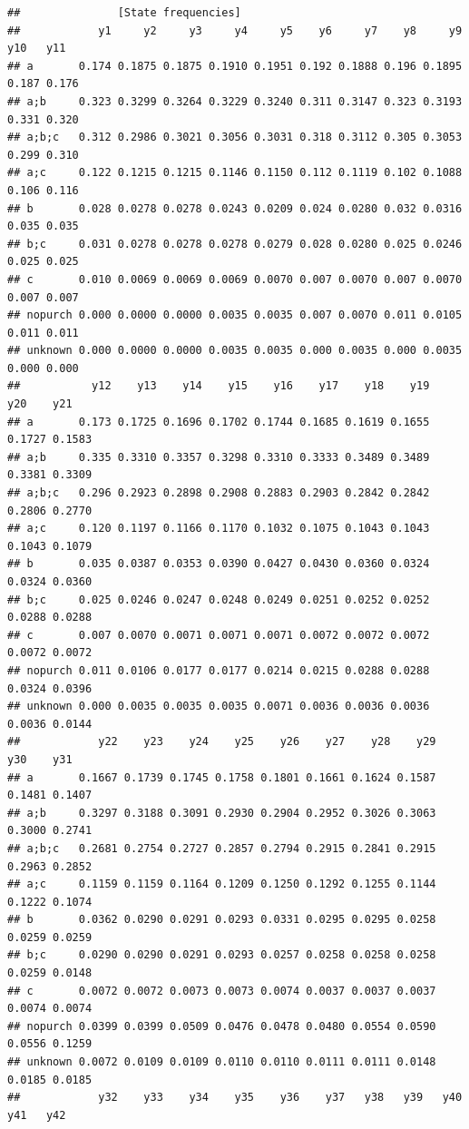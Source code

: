 \documentclass[
]{book}
\begin{document}
\begin{verbatim}
##               [State frequencies]
##            y1     y2     y3     y4     y5    y6     y7    y8     y9   y10   y11
## a       0.174 0.1875 0.1875 0.1910 0.1951 0.192 0.1888 0.196 0.1895 0.187 0.176
## a;b     0.323 0.3299 0.3264 0.3229 0.3240 0.311 0.3147 0.323 0.3193 0.331 0.320
## a;b;c   0.312 0.2986 0.3021 0.3056 0.3031 0.318 0.3112 0.305 0.3053 0.299 0.310
## a;c     0.122 0.1215 0.1215 0.1146 0.1150 0.112 0.1119 0.102 0.1088 0.106 0.116
## b       0.028 0.0278 0.0278 0.0243 0.0209 0.024 0.0280 0.032 0.0316 0.035 0.035
## b;c     0.031 0.0278 0.0278 0.0278 0.0279 0.028 0.0280 0.025 0.0246 0.025 0.025
## c       0.010 0.0069 0.0069 0.0069 0.0070 0.007 0.0070 0.007 0.0070 0.007 0.007
## nopurch 0.000 0.0000 0.0000 0.0035 0.0035 0.007 0.0070 0.011 0.0105 0.011 0.011
## unknown 0.000 0.0000 0.0000 0.0035 0.0035 0.000 0.0035 0.000 0.0035 0.000 0.000
##           y12    y13    y14    y15    y16    y17    y18    y19    y20    y21
## a       0.173 0.1725 0.1696 0.1702 0.1744 0.1685 0.1619 0.1655 0.1727 0.1583
## a;b     0.335 0.3310 0.3357 0.3298 0.3310 0.3333 0.3489 0.3489 0.3381 0.3309
## a;b;c   0.296 0.2923 0.2898 0.2908 0.2883 0.2903 0.2842 0.2842 0.2806 0.2770
## a;c     0.120 0.1197 0.1166 0.1170 0.1032 0.1075 0.1043 0.1043 0.1043 0.1079
## b       0.035 0.0387 0.0353 0.0390 0.0427 0.0430 0.0360 0.0324 0.0324 0.0360
## b;c     0.025 0.0246 0.0247 0.0248 0.0249 0.0251 0.0252 0.0252 0.0288 0.0288
## c       0.007 0.0070 0.0071 0.0071 0.0071 0.0072 0.0072 0.0072 0.0072 0.0072
## nopurch 0.011 0.0106 0.0177 0.0177 0.0214 0.0215 0.0288 0.0288 0.0324 0.0396
## unknown 0.000 0.0035 0.0035 0.0035 0.0071 0.0036 0.0036 0.0036 0.0036 0.0144
##            y22    y23    y24    y25    y26    y27    y28    y29    y30    y31
## a       0.1667 0.1739 0.1745 0.1758 0.1801 0.1661 0.1624 0.1587 0.1481 0.1407
## a;b     0.3297 0.3188 0.3091 0.2930 0.2904 0.2952 0.3026 0.3063 0.3000 0.2741
## a;b;c   0.2681 0.2754 0.2727 0.2857 0.2794 0.2915 0.2841 0.2915 0.2963 0.2852
## a;c     0.1159 0.1159 0.1164 0.1209 0.1250 0.1292 0.1255 0.1144 0.1222 0.1074
## b       0.0362 0.0290 0.0291 0.0293 0.0331 0.0295 0.0295 0.0258 0.0259 0.0259
## b;c     0.0290 0.0290 0.0291 0.0293 0.0257 0.0258 0.0258 0.0258 0.0259 0.0148
## c       0.0072 0.0072 0.0073 0.0073 0.0074 0.0037 0.0037 0.0037 0.0074 0.0074
## nopurch 0.0399 0.0399 0.0509 0.0476 0.0478 0.0480 0.0554 0.0590 0.0556 0.1259
## unknown 0.0072 0.0109 0.0109 0.0110 0.0110 0.0111 0.0111 0.0148 0.0185 0.0185
##            y32    y33    y34    y35    y36    y37   y38   y39   y40   y41   y42

\end{verbatim}
\end{document}
